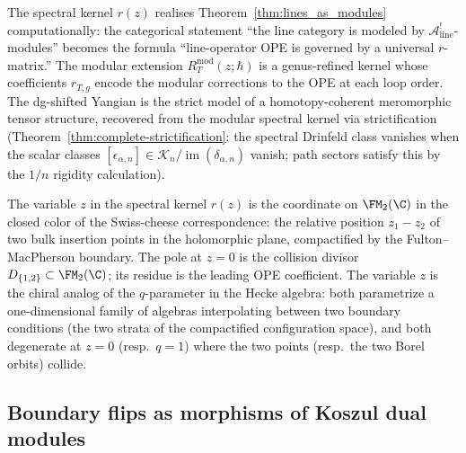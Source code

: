 \begin{remark}
\label{rem:abstract-to-concrete-kernel}
The spectral kernel $r(z)$ realises
Theorem~\ref{thm:lines_as_modules} computationally: the categorical
statement ``the line category is modeled by
$\mathcal{A}^!_{\mathrm{line}}$-modules'' becomes the formula
``line-operator OPE is governed by a universal $r$-matrix.'' The
modular extension $R_T^{\mathrm{mod}}(z;\hbar)$ is a genus-refined
kernel whose coefficients $r_{T,g}$ encode the modular corrections
to the OPE at each loop order. The dg-shifted Yangian is the strict
model of a homotopy-coherent meromorphic tensor structure, recovered
from the modular spectral kernel via strictification
(Theorem~\ref{thm:complete-strictification}: the spectral Drinfeld
class vanishes when the scalar classes $[\epsilon_{\alpha,n}]\in
\mathscr K_n/\operatorname{im}(\delta_{\alpha,n})$ vanish; path
sectors satisfy this by the $1/n$ rigidity calculation).
\end{remark}

\begin{remark}
\label{rem:spectral-parameter-fm2}
The variable $z$ in the spectral kernel $r(z)$ is the coordinate on
$\FM_2(\C)$ in the closed color of the Swiss-cheese correspondence:
the relative position $z_1 - z_2$ of two bulk insertion points in
the holomorphic plane, compactified by the Fulton--MacPherson
boundary. The pole at $z = 0$ is the collision divisor
$D_{\{1,2\}} \subset \FM_2(\C)$; its residue is the leading OPE
coefficient. The variable $z$ is the chiral analog of the
$q$-parameter in the Hecke algebra: both parametrize a
one-dimensional family of algebras interpolating between two
boundary conditions (the two strata of the compactified
configuration space), and both degenerate at $z = 0$ (resp.\
$q = 1$) where the two points (resp.\ the two Borel orbits)
collide.
\end{remark}

\subsection{Boundary flips as morphisms of Koszul dual modules}
\label{subsec:boundary-flips}

